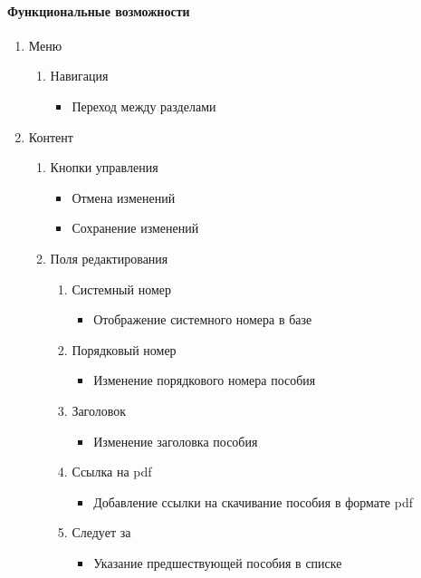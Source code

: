 \paragraph{Функциональные возможности}
\begin{enumerate}
	\item Меню
	\begin{enumerate}
		\item Навигация
		\begin{itemize}
			\item Переход между разделами
		\end{itemize}
	\end{enumerate}

	\item Контент
	\begin{enumerate}
		\item Кнопки управления
		\begin{itemize}
			\item Отмена изменений
			\item Сохранение изменений
		\end{itemize}

		\item Поля редактирования
		\begin{enumerate}
			\item Системный номер
			\begin{itemize}
				\item Отображение системного номера в базе
			\end{itemize}

			\item Порядковый номер
			\begin{itemize}
				\item Изменение порядкового номера пособия
			\end{itemize}

			\item Заголовок
			\begin{itemize}
				\item Изменение заголовка пособия
			\end{itemize}

			\item Ссылка на pdf
			\begin{itemize}
				\item Добавление ссылки на скачивание пособия в формате pdf
			\end{itemize}

			\item Следует за
			\begin{itemize}
				\item Указание предшествующей пособия в списке 
			\end{itemize}


\end{enumerate}
\end{enumerate}
\end{enumerate}
